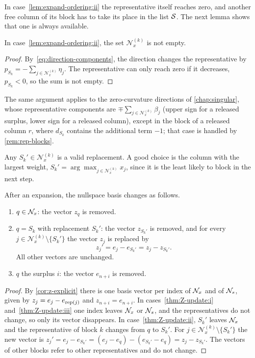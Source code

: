 In case~\ref{lem:expand-ordering:ii} the representative itself reaches zero, and another free column of its block
has to take its place in the list $\mathcal{S}$. The next lemma shows that one is always
available.

\begin{lemma} \label{lem:replacement}
In case~\ref{lem:expand-ordering:ii}, the set $\mathcal{N}_x^{(k)}$ is not empty.
\end{lemma}

\begin{proof}
By~\eqref{eq:direction-components}, the direction changes the representative by
$p_{S_k} = -\sum_{j\in\mathcal{N}_x^{(k)}}\eta_j$. The representative can only reach zero if it
decreases, $p_{S_k}<0$, so the sum is not empty.
\end{proof}

The same argument applies to the zero-curvature directions of \cref{chap:singular}, whose
representative components are $\mp\sum_{j\in\mathcal{N}_x^{(k)}}\beta_j$ (upper sign for a released
surplus, lower sign for a released column), except in the block of a
released column $r$, where $d_{S_k}$ contains the additional term $-1$; that case is handled by
\cref{rem:rep-blocks}.

Any $S_k'\in\mathcal{N}_x^{(k)}$ is a valid replacement. A good choice is the column with the largest
weight, $S_k' = \arg\max_{j\in\mathcal{N}_x^{(k)}}x_j$, since it is the least likely to block in the
next step.

\begin{theorem} \label{thm:Z-update}
After an expansion, the nullspace basis changes as follows.
\begin{enumerate}
    \item \label{thm:Z-update:i} $q\in\mathcal{N}_x$: the vector $z_q$ is removed.
    \item \label{thm:Z-update:ii} $q = S_k$ with replacement $S_k'$: the vector $z_{S_k'}$ is removed, and for every
          $j\in\mathcal{N}_x^{(k)}\setminus\{S_k'\}$ the vector $z_j$ is replaced by
          \[
          z_j' = e_j - e_{S_k'} = z_j - z_{S_k'} .
          \]
          All other vectors are unchanged.
    \item \label{thm:Z-update:iii} $q$ the surplus $i$: the vector $e_{n+i}$ is removed.
\end{enumerate}
\end{theorem}

\begin{proof}
By \cref{cor:z-explicit} there is one basis vector per index of $\mathcal{N}_x$ and of $\mathcal{N}_s$, given by
$z_j = e_j - e_{\operatorname{rep}(j)}$ and $z_{n+i} = e_{n+i}$. In cases~\ref{thm:Z-update:i} and~\ref{thm:Z-update:iii} one index leaves $\mathcal{N}_x$ or
$\mathcal{N}_s$, and the representatives do not change, so only its vector disappears. In case~\ref{thm:Z-update:ii},
$S_k'$ leaves $\mathcal{N}_x$ and the representative of block $k$ changes from $q$ to $S_k'$. For
$j\in\mathcal{N}_x^{(k)}\setminus\{S_k'\}$ the new vector is
$z_j' = e_j - e_{S_k'} = (e_j - e_q) - (e_{S_k'} - e_q) = z_j - z_{S_k'}$. The vectors of other blocks refer
to other representatives and do not change.
\end{proof}

